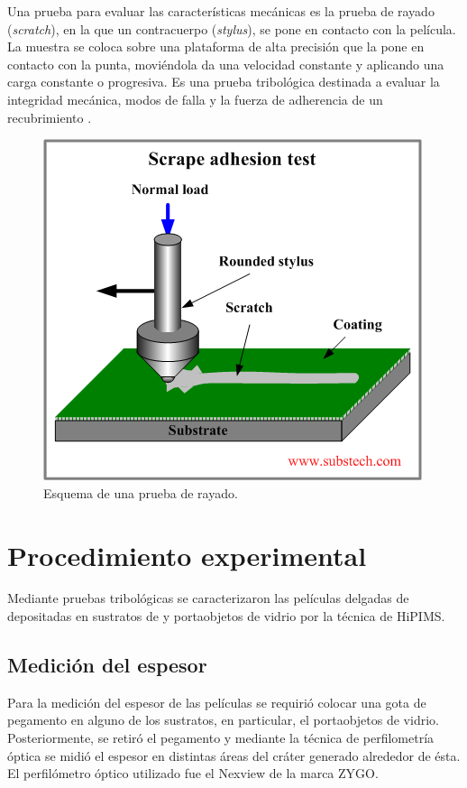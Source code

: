 \documentclass[12pt]{IEEEtran}
\begin{document}
Una prueba para evaluar las características mecánicas es la prueba de rayado (\emph{scratch}), en la que un contracuerpo (\emph{stylus}), se pone en contacto con la película. La muestra se coloca sobre una plataforma de alta precisión que la pone en contacto con la punta, moviéndola da una velocidad constante y aplicando una carga constante o progresiva. Es una prueba tribológica destinada a evaluar la integridad mecánica, modos de falla y la fuerza de adherencia de un recubrimiento \cite{internationalStandardTestMethod}.

\begin{figure}[htp]
	\centering
	\includegraphics[width=0.8\linewidth]{scratch-test}
	\caption{Esquema de una prueba de rayado. \cite{kopeliovich_adhesion_nodate}}
	\label{fig:scratch-test}
\end{figure}

\section{Procedimiento experimental}

Mediante pruebas tribológicas se caracterizaron las películas delgadas de  depositadas en sustratos de  y portaobjetos de vidrio por la técnica de HiPIMS.

\subsection{Medición del espesor}

Para la medición del espesor de las películas se requirió colocar una gota de pegamento en alguno de los sustratos, en particular, el portaobjetos de vidrio. Posteriormente, se retiró el pegamento y mediante la técnica de perfilometría óptica se midió el espesor en distintas áreas del cráter generado alrededor de ésta. El perfilómetro óptico utilizado fue el Nexview de la marca ZYGO.
\end{document}
